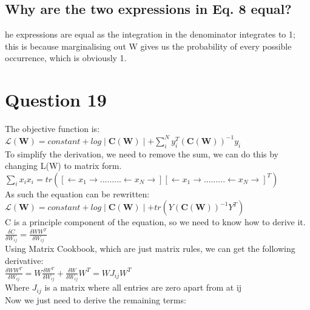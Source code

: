 \documentclass[a4paper, 9pt]{article}
\begin{document}
\subsection*{Why are the two expressions in Eq. 8 equal?}
he expressions are equal as the integration in the denominator integrates to 1; this is because marginalising out W gives us the probability of every possible occurrence, which is obviously 1.

\section*{Question 19}
The objective function is: \\
\( \mathcal{L} (\mathbf{W}) = constant + log\mid \mathbf{C}(\mathbf{W})\mid + \sum\limits_{i}^N y_{i}^{T}(\mathbf{C}(\mathbf{W}))^{-1} y_{i} \) \\
\newline
To simplify the derivation, we need to remove the sum, we can do this by changing L(W) to matrix form. \\

\( \sum\limits_i x_{i}x_{i} = tr([\leftarrow x_{1} \rightarrow.........\leftarrow x_{N} \rightarrow][\leftarrow x_{1} \rightarrow.........\leftarrow x_{N} \rightarrow]^{T}) \) \\
\newline
As such the equation can be rewritten: \\ 

\( \mathcal{L}(\mathbf{W}) = constant + log\mid \mathbf{C}(\mathbf{W})\mid + tr(Y(\mathbf{C}(\mathbf{W}))^{-1}Y^T) \) \\
\newline
C is a principle component of the equation, so we need to know how to derive it.\\

\( \frac{\delta C}{\delta W_{ij}} = \frac{\delta WW^T}{\delta W_{ij}} \) \\
\newline
Using Matrix Cookbook, which are just matrix rules, we can get the following derivative: \\ 

\( \frac{\delta WW^T}{\delta W_{ij}} = W\frac{\delta W^T}{\delta W_{ij}} + \frac{\delta W}{\delta W_{ij}} W^T = WJ_{ij}W^T \) \\

Where \( J_{ij} \) is a matrix where all entries are zero apart from at ij \\
\newline
Now we just need to derive the remaining terms: \\
\end{document}
